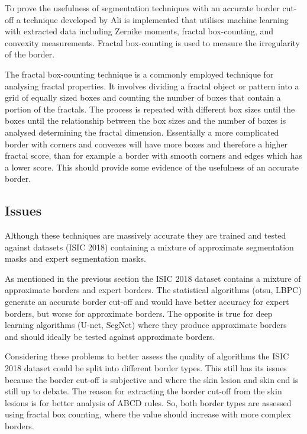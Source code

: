 To prove the usefulness of segmentation techniques with an accurate border cut-off a technique developed by Ali\cite{Ali2020b} is implemented that utilises machine learning with extracted data including Zernike moments, fractal box-counting, and convexity measurements. Fractal box-counting is used to measure the irregularity of the border.

The fractal box-counting technique is a commonly employed technique for analysing fractal properties. It involves dividing a fractal object or pattern into a grid of equally sized boxes and counting the number of boxes that contain a portion of the fractals. The process is repeated with different box sizes until the boxes until the relationship between the box sizes and the number of boxes is analysed determining the fractal dimension\cite{Hamburger1996}. Essentially a more complicated border with corners and convexes will have more boxes and therefore a higher fractal score, than for example a border with smooth corners and edges which has a lower score. This should provide some evidence of the usefulness of an accurate border.

\subsection{Issues}
Although these techniques are massively accurate they are trained and tested against datasets (ISIC 2018) containing a mixture of approximate segmentation masks and expert segmentation masks. 

As mentioned in the previous section the ISIC 2018 dataset contains a mixture of approximate borders and expert borders. The statistical algorithms (otsu, LBPC) generate an accurate border cut-off and would have better accuracy for expert borders, but worse for approximate borders. The opposite is true for deep learning algorithms (U-net, SegNet) where they produce approximate borders and should ideally be tested against approximate borders.

Considering these problems to better assess the quality of algorithms the ISIC 2018 dataset could be split into different border types. This still has its issues because the border cut-off is subjective and where the skin lesion and skin end is still up to debate. The reason for extracting the border cut-off from the skin lesions is for better analysis of ABCD rules. So, both border types are assessed using fractal box counting, where the value should increase with more complex borders. 

